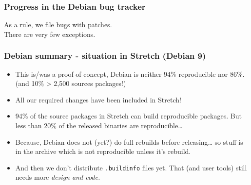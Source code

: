 \documentclass[14pt,aspectratio=169]{beamer}
\begin{document}
\begin{frame}
 \frametitle{Progress in the Debian bug tracker}
 \begin{center}
  \footnotesize{As a rule, we file bugs with patches. \\
  There are very few exceptions.}
  \vfill
 \end{center}
\end{frame}



\begin{frame}
	\frametitle{Debian summary - situation in Stretch (Debian 9)}
 \begin{itemize}
  \item This is/was a proof-of-concept, Debian is neither 94\% reproducible nor
  86\%. (and 10\% > 2,500 sources packages!)
  \item<2-4> All our required changes have been included in Stretch!
  \item<3-4> 94\% of the source packages in Stretch can build reproducible packages. But less than 20\% of the released binaries are reproducible…
  \item<3-4> Because, Debian does not (yet?) do full rebuilds before
  releasing… so stuff is in the archive which is not reproducible unless it's
  rebuild.
  \item<4> And then we don't distribute \texttt{.buildinfo} files yet.
   That (and user tools) still needs more \it{design} and code.
 \end{itemize}
\end{frame}
\end{document}
